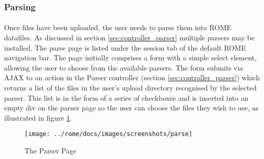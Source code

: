 \subsubsection{Parsing}
\label{sec:view_parse}

\paragraph{}
Once files have been uploaded, the user needs to parse them into ROME datafiles. As discussed in section \ref{sec:controller_parser} multiple parsers may be installed. The parse page is listed under the session tab of the default ROME navigation bar. The page initially comprises a form with a simple select element, allowing the user to choose from the available parsers. The form submits via AJAX to an action in the Parser controller (section \ref{sec:controller_parser}) which returns a list of the files in the user's upload directory recognised by the selected parser. This list is in the form of a series of checkboxes and is inserted into an empty div on the parser page so the user can choose the files they wish to use, as illustrated in figure \ref{fig:parser_view}.


\begin{figure}[h]
\centering
\texttt{[image: ../rome/docs/images/screenshots/parse]}
\caption{The Parser Page}\label{fig:parser_view}
\end{figure}

\clearpage
